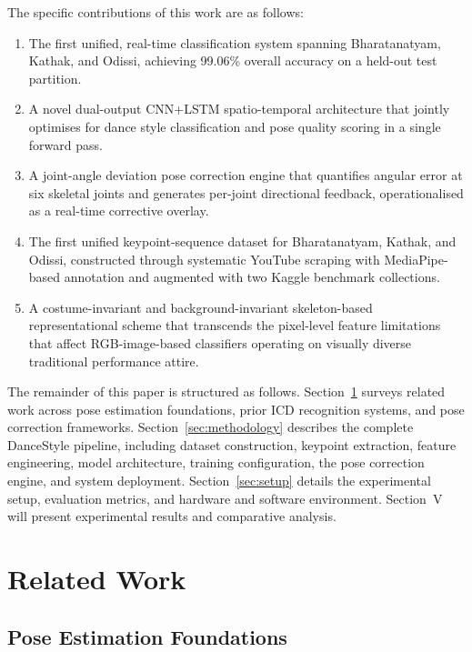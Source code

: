 \documentclass[journal]{IEEEtran}
\begin{document}
The specific contributions of this work are as follows:
\begin{enumerate}
    \item The first unified, real-time classification system spanning
    Bharatanatyam, Kathak, and Odissi, achieving 99.06\% overall
    accuracy on a held-out test partition.
    \item A novel dual-output CNN+LSTM spatio-temporal architecture
    that jointly optimises for dance style classification and
    pose quality scoring in a single forward pass.
    \item A joint-angle deviation pose correction engine that quantifies
    angular error at six skeletal joints and generates per-joint
    directional feedback, operationalised as a real-time corrective
    overlay.
    \item The first unified keypoint-sequence dataset for Bharatanatyam,
    Kathak, and Odissi, constructed through systematic YouTube scraping
    with MediaPipe-based annotation and augmented with two Kaggle
    benchmark collections.
    \item A costume-invariant and background-invariant skeleton-based
    representational scheme that transcends the pixel-level feature
    limitations that affect RGB-image-based classifiers operating on
    visually diverse traditional performance attire.
\end{enumerate}

The remainder of this paper is structured as follows.
Section~\ref{sec:related} surveys related work across pose estimation
foundations, prior ICD recognition systems, and pose correction
frameworks. Section~\ref{sec:methodology} describes the complete
DanceStyle pipeline, including dataset construction, keypoint extraction,
feature engineering, model architecture, training configuration, the
pose correction engine, and system deployment. Section~\ref{sec:setup}
details the experimental setup, evaluation metrics, and hardware and
software environment. Section~V will present experimental results and
comparative analysis.

\section{Related Work}
\label{sec:related}

\subsection{Pose Estimation Foundations}
\end{document}
